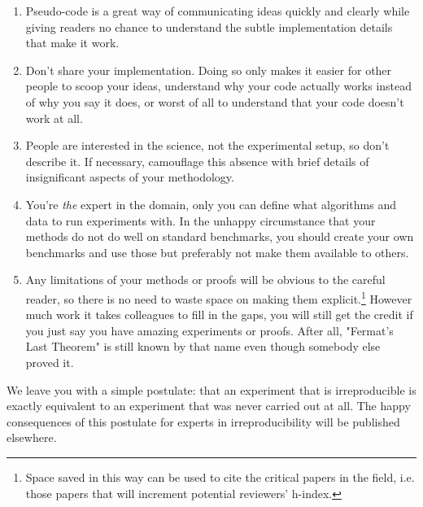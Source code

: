 \documentclass[a4paper,11pt]{article}
\begin{document}
\begin{enumerate}
\item Pseudo-code is a great way of communicating ideas quickly and clearly while giving readers no chance to understand the subtle implementation details that make it work. 
\item Don't share your implementation. Doing so  only makes it easier for other people
to scoop your ideas, understand why your code actually works instead of why you say it does, or worst of all to 
understand that your code doesn't work at all. 
\item People are interested in the science, not the experimental setup, so don't
describe it.  If necessary, camouflage this absence with brief details of insignificant aspects of your methodology.
\item You're \emph{the} expert in the domain, only you can define what
algorithms and data to run experiments with. In the unhappy circumstance that your methods do not do well on standard benchmarks, you should
create your own benchmarks and use those but preferably not make them available to others.
\item Any limitations of your methods or proofs will be obvious to the
careful reader, so there is no need to waste space on making them explicit.\footnote{Space saved in this way can be used to cite the critical papers in the field, i.e. those papers that will increment potential reviewers' h-index.}  However much work it takes colleagues to fill in the gaps, you will still get the credit if you just say you have amazing experiments or proofs. 
After all, "Fermat's Last Theorem" is still known by that name even though somebody else proved it.
\end{enumerate}

We leave you with a simple postulate: that an experiment that is irreproducible is exactly equivalent to an experiment that was never carried out at all. The happy consequences of this postulate for experts in irreproducibility will be published elsewhere. 


\end{document}
